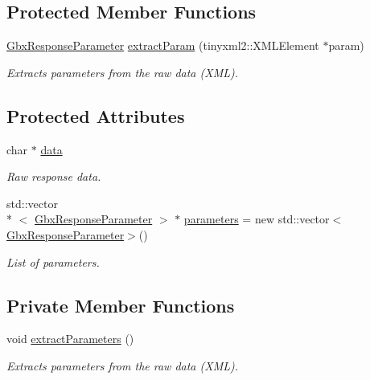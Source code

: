 \subsection*{Protected Member Functions}
\begin{DoxyCompactItemize}
\item 
\hyperlink{classGbxResponseParameter}{Gbx\-Response\-Parameter} \hyperlink{classGbxServerResponse_afa89ad0963df83f64934c9a54bb0dac6}{extract\-Param} (tinyxml2\-::\-X\-M\-L\-Element $\ast$param)
\begin{DoxyCompactList}\small\item\em Extracts parameters from the raw data (X\-M\-L). \end{DoxyCompactList}\end{DoxyCompactItemize}
\subsection*{Protected Attributes}
\begin{DoxyCompactItemize}
\item 
char $\ast$ \hyperlink{classGbxServerResponse_aeee1fc539a5881334926e5c6789581bd}{data}
\begin{DoxyCompactList}\small\item\em Raw response data. \end{DoxyCompactList}\item 
std\-::vector\\*
$<$ \hyperlink{classGbxResponseParameter}{Gbx\-Response\-Parameter} $>$ $\ast$ \hyperlink{classGbxServerResponse_ad6fef5319c4da9461f4cd0d72d8b5ee8}{parameters} = new std\-::vector$<$\hyperlink{classGbxResponseParameter}{Gbx\-Response\-Parameter}$>$()
\begin{DoxyCompactList}\small\item\em List of parameters. \end{DoxyCompactList}\end{DoxyCompactItemize}
\subsection*{Private Member Functions}
\begin{DoxyCompactItemize}
\item 
void \hyperlink{classGbxCallBack_a0a9b9db5ebdc8040058b542fb51283d7}{extract\-Parameters} ()
\begin{DoxyCompactList}\small\item\em Extracts parameters from the raw data (X\-M\-L). \end{DoxyCompactList}\end{DoxyCompactItemize}
